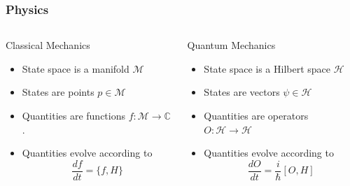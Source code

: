 \documentclass{beamer}
\newcommand{\Cplx}{\mathbb{C}}
\begin{document}
\begin{frame}
\frametitle{Physics}
        \begin{columns}[T]
            \begin{column}{.5\textwidth}
                \begin{block}{Classical Mechanics}
                    \begin{itemize}
                        \item{} State space is a manifold $\mathcal{M}$
                        \item{} States are points $p \in \mathcal{M}$
                        \item{} Quantities are functions $f:\mathcal{M}\rightarrow\Cplx$.
                        \item{} Quantities evolve according to
                        \begin{equation*}
                            \frac{df}{dt} = \{f,H\}
                        \end{equation*}
                    \end{itemize}
                \end{block}
            \end{column}
        
        
            \begin{column}{.5\textwidth}
                \begin{block}{Quantum Mechanics}
                    \begin{itemize}
                        \item{} State space is a Hilbert space $\mathcal{H}$
                        \item{} States are vectors $\psi \in \mathcal{H}$
                        \item{} Quantities are operators $O:\mathcal{H}\rightarrow\mathcal{H}$
                        \item{} Quantities evolve according to
                        \begin{equation*}
                            \frac{dO}{dt} = \frac{i}{\hbar}[O,H]
                        \end{equation*}
                    \end{itemize}
                \end{block}
            \end{column}
        \end{columns}
\end{frame}
\end{document}
